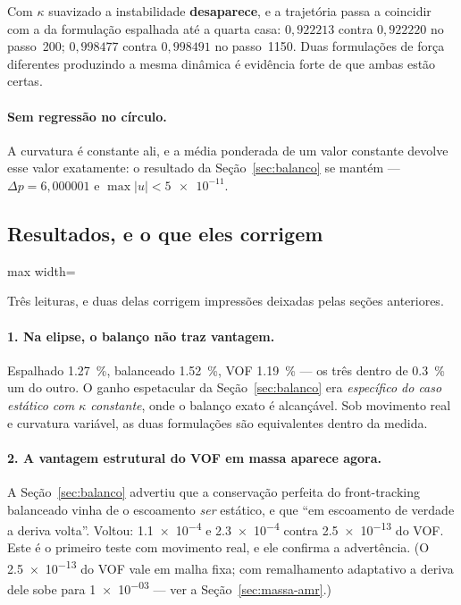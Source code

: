 Com $\kappa$ suavizado a instabilidade \textbf{desaparece}, e a trajet\'oria
passa a coincidir com a da formula\c{c}\~ao espalhada at\'e a quarta casa:
$0{,}922213$ contra $0{,}922220$ no passo~200; $0{,}998477$ contra $0{,}998491$
no passo~1150. Duas formula\c{c}\~oes de for\c{c}a diferentes produzindo a mesma
din\^amica \'e evid\^encia forte de que ambas est\~ao certas.

\paragraph{Sem regress\~ao no c\'irculo.} A curvatura \'e constante ali, e a
m\'edia ponderada de um valor constante devolve esse valor exatamente: o
resultado da Se\c{c}\~ao~\ref{sec:balanco} se mant\'em --- $\Delta p = 6{,}000001$
e $\max\lvert u\rvert < \num{5e-11}$.

\subsection{Resultados, e o que eles corrigem}

\begin{adjustbox}{max width=\linewidth}
\end{adjustbox}

Tr\^es leituras, e duas delas corrigem impress\~oes deixadas pelas se\c{c}\~oes
anteriores.

\paragraph{1. Na elipse, o balan\c{c}o n\~ao traz vantagem.} Espalhado
\SI{1.27}{\percent}, balanceado \SI{1.52}{\percent}, VOF \SI{1.19}{\percent} ---
os tr\^es dentro de \SI{0.3}{\percent} um do outro. O ganho espetacular da
Se\c{c}\~ao~\ref{sec:balanco} era \emph{espec\'ifico do caso est\'atico com
$\kappa$ constante}, onde o balan\c{c}o exato \'e alcan\c{c}\'avel. Sob
movimento real e curvatura vari\'avel, as duas formula\c{c}\~oes s\~ao
equivalentes dentro da medida.

\paragraph{2. A vantagem estrutural do VOF em massa aparece agora.} A
Se\c{c}\~ao~\ref{sec:balanco} advertiu que a conserva\c{c}\~ao perfeita do
front-tracking balanceado vinha de o escoamento \emph{ser} est\'atico, e que ``em
escoamento de verdade a deriva volta''. Voltou: \num{1.1e-4} e \num{2.3e-4}
contra \num{2.5e-13} do VOF. Este \'e o primeiro teste com movimento real, e ele
confirma a advert\^encia. (O \num{2.5e-13} do VOF vale em malha fixa; com
remalhamento adaptativo a deriva dele sobe para \num{1e-03} --- ver a
Se\c{c}\~ao~\ref{sec:massa-amr}.)

